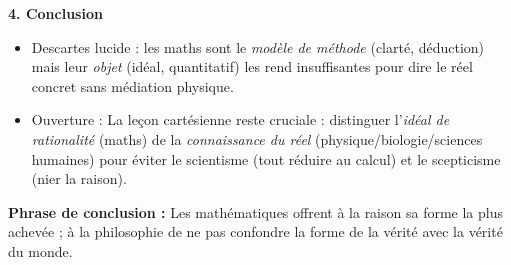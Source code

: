 \documentclass[11pt]{article}
\begin{document}
\begin{exoresolu}
    \textbf{4. Conclusion}
    \begin{itemize}
        \item Descartes lucide : les maths sont le \emph{modèle de méthode} (clarté, déduction) mais leur \emph{objet} (idéal, quantitatif) les rend insuffisantes pour dire le réel concret sans médiation physique.
        \item Ouverture : La leçon cartésienne reste cruciale : distinguer l'\emph{idéal de rationalité} (maths) de la \emph{connaissance du réel} (physique/biologie/sciences humaines) pour éviter le scientisme (tout réduire au calcul) et le scepticisme (nier la raison).
    \end{itemize}
    \textbf{Phrase de conclusion :} \guillemotleft Les mathématiques offrent à la raison sa forme la plus achevée ; à la philosophie de ne pas confondre la forme de la vérité avec la vérité du monde. \guillemotright
\end{exoresolu}
\end{document}
